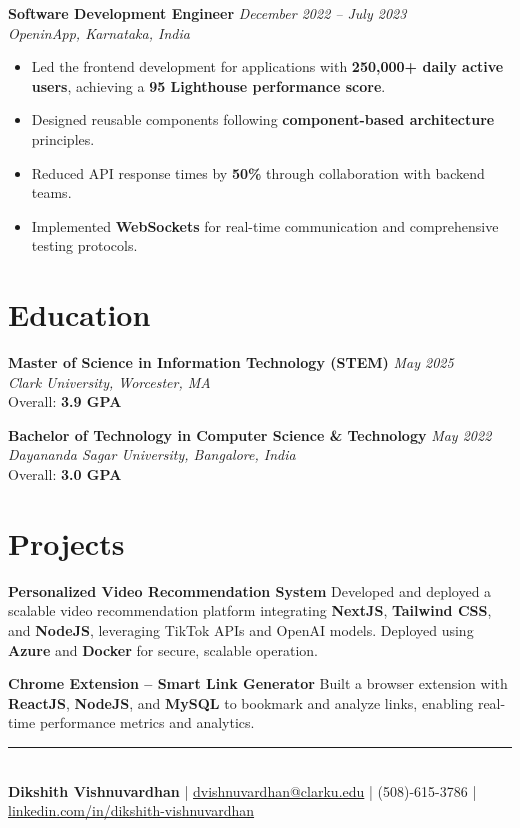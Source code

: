 \documentclass[a4paper,10pt]{article}
\begin{document}
\textbf{Software Development Engineer} \hfill \textit{December 2022 -- July 2023}\\
\textit{OpeninApp, Karnataka, India}  
\begin{itemize}[leftmargin=*]
    \item Led the frontend development for applications with \textbf{250,000+ daily active users}, achieving a \textbf{95 Lighthouse performance score}.
    \item Designed reusable components following \textbf{component-based architecture} principles.
    \item Reduced API response times by \textbf{50\%} through collaboration with backend teams.
    \item Implemented \textbf{WebSockets} for real-time communication and comprehensive testing protocols.
\end{itemize}

\section*{Education}
\textbf{Master of Science in Information Technology (STEM)} \hfill \textit{May 2025}\\
\textit{Clark University, Worcester, MA} \\
Overall: \textbf{3.9 GPA}

\textbf{Bachelor of Technology in Computer Science \& Technology} \hfill \textit{May 2022}\\
\textit{Dayananda Sagar University, Bangalore, India} \\
Overall: \textbf{3.0 GPA}

\section*{Projects}
\textbf{Personalized Video Recommendation System}  
Developed and deployed a scalable video recommendation platform integrating \textbf{NextJS}, \textbf{Tailwind CSS}, and \textbf{NodeJS}, leveraging TikTok APIs and OpenAI models. Deployed using \textbf{Azure} and \textbf{Docker} for secure, scalable operation.

\textbf{Chrome Extension -- Smart Link Generator}  
Built a browser extension with \textbf{ReactJS}, \textbf{NodeJS}, and \textbf{MySQL} to bookmark and analyze links, enabling real-time performance metrics and analytics.

\vfill
\noindent\rule{\textwidth}{0.5pt}\\
\footnotesize{\textbf{Dikshith Vishnuvardhan} | \href{mailto:dvishnuvardhan@clarku.edu}{dvishnuvardhan@clarku.edu} | (508)-615-3786 | \href{https://linkedin.com/in/dikshith-vishnuvardhan}{linkedin.com/in/dikshith-vishnuvardhan}}
\end{document}
